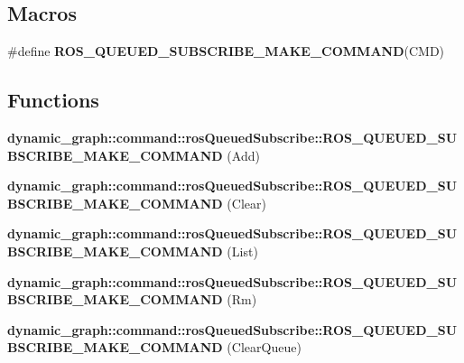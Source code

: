 \subsection*{Macros}
\begin{DoxyCompactItemize}
\item 
\#define {\bfseries R\+O\+S\+\_\+\+Q\+U\+E\+U\+E\+D\+\_\+\+S\+U\+B\+S\+C\+R\+I\+B\+E\+\_\+\+M\+A\+K\+E\+\_\+\+C\+O\+M\+M\+A\+ND}(C\+MD)
\end{DoxyCompactItemize}
\subsection*{Functions}
\begin{DoxyCompactItemize}
\item 
{\bfseries dynamic\+\_\+graph\+::command\+::ros\+Queued\+Subscribe\+::\+R\+O\+S\+\_\+\+Q\+U\+E\+U\+E\+D\+\_\+\+S\+U\+B\+S\+C\+R\+I\+B\+E\+\_\+\+M\+A\+K\+E\+\_\+\+C\+O\+M\+M\+A\+ND} (Add)\hypertarget{ros__queued__subscribe_8hh_aef1263d3cfe9681448c0d69649179259}{}\label{ros__queued__subscribe_8hh_aef1263d3cfe9681448c0d69649179259}

\item 
{\bfseries dynamic\+\_\+graph\+::command\+::ros\+Queued\+Subscribe\+::\+R\+O\+S\+\_\+\+Q\+U\+E\+U\+E\+D\+\_\+\+S\+U\+B\+S\+C\+R\+I\+B\+E\+\_\+\+M\+A\+K\+E\+\_\+\+C\+O\+M\+M\+A\+ND} (Clear)\hypertarget{ros__queued__subscribe_8hh_a7845a3bacdc7be03123b88140ea091f9}{}\label{ros__queued__subscribe_8hh_a7845a3bacdc7be03123b88140ea091f9}

\item 
{\bfseries dynamic\+\_\+graph\+::command\+::ros\+Queued\+Subscribe\+::\+R\+O\+S\+\_\+\+Q\+U\+E\+U\+E\+D\+\_\+\+S\+U\+B\+S\+C\+R\+I\+B\+E\+\_\+\+M\+A\+K\+E\+\_\+\+C\+O\+M\+M\+A\+ND} (List)\hypertarget{ros__queued__subscribe_8hh_a4c330a8b4a91c14660428bd492055941}{}\label{ros__queued__subscribe_8hh_a4c330a8b4a91c14660428bd492055941}

\item 
{\bfseries dynamic\+\_\+graph\+::command\+::ros\+Queued\+Subscribe\+::\+R\+O\+S\+\_\+\+Q\+U\+E\+U\+E\+D\+\_\+\+S\+U\+B\+S\+C\+R\+I\+B\+E\+\_\+\+M\+A\+K\+E\+\_\+\+C\+O\+M\+M\+A\+ND} (Rm)\hypertarget{ros__queued__subscribe_8hh_ae6258e34dff92af9fbbfa2eb7e6417d7}{}\label{ros__queued__subscribe_8hh_ae6258e34dff92af9fbbfa2eb7e6417d7}

\item 
{\bfseries dynamic\+\_\+graph\+::command\+::ros\+Queued\+Subscribe\+::\+R\+O\+S\+\_\+\+Q\+U\+E\+U\+E\+D\+\_\+\+S\+U\+B\+S\+C\+R\+I\+B\+E\+\_\+\+M\+A\+K\+E\+\_\+\+C\+O\+M\+M\+A\+ND} (Clear\+Queue)\hypertarget{ros__queued__subscribe_8hh_a42b7f79773943fc41f6a89e21016c8c8}{}\label{ros__queued__subscribe_8hh_a42b7f79773943fc41f6a89e21016c8c8}


\end{DoxyCompactItemize}
